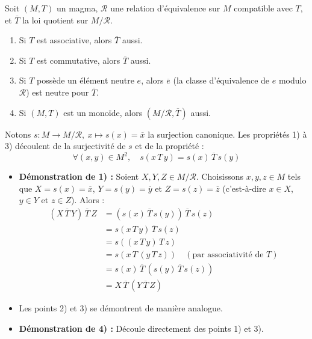 \documentclass[a4paper,11pt]{article}
\begin{document}
\begin{proposition}
Soit $(M, T)$ un magma, $\mathcal{R}$ une relation d'équivalence sur $M$ compatible avec $T$, et $\overline{T}$ la loi quotient sur $M / \mathcal{R}$.
\begin{enumerate}
    \item Si $T$ est associative, alors $\overline{T}$ aussi.
    \item Si $T$ est commutative, alors $\overline{T}$ aussi.
    \item Si $T$ possède un élément neutre $e$, alors $\overline{e}$ (la classe d'équivalence de $e$ modulo $\mathcal{R}$) est neutre pour $\overline{T}$.
    \item Si $(M, T)$ est un monoïde, alors $(M / \mathcal{R}, \overline{T})$ aussi.
\end{enumerate}
\end{proposition}

\begin{demonstration}
Notons $s : M \to M / \mathcal{R}, \ x \mapsto s(x) = \overline{x}$ la surjection canonique.
Les propriétés 1) à 3) découlent de la surjectivité de $s$ et de la propriété :
\[
\forall (x, y) \in M^2, \quad s(x \, T \, y) = s(x) \, \overline{T} \, s(y)
\]
\begin{itemize}
    \item \textbf{Démonstration de 1) :} Soient $X, Y, Z \in M / \mathcal{R}$. Choisissons $x, y, z \in M$ tels que $X = s(x) = \overline{x}$, $Y = s(y) = \overline{y}$ et $Z = s(z) = \overline{z}$ (c'est-à-dire $x \in X$, $y \in Y$ et $z \in Z$). Alors :
    \begin{align*}
        (X \, \overline{T} \, Y) \, \overline{T} \, Z &= (s(x) \, \overline{T} \, s(y)) \, \overline{T} \, s(z) \\
                                                       &= s(x \, T \, y) \, \overline{T} \, s(z) \\
                                                       &= s((x \, T \, y) \, T \, z) \\
                                                       &= s(x \, T \, (y \, T \, z)) \quad (\text{par associativité de } T) \\
                                                       &= s(x) \, \overline{T} \, (s(y) \, \overline{T} \, s(z)) \\
                                                       &= X \, \overline{T} \, (Y \, \overline{T} \, Z)
    \end{align*}
    \item Les points 2) et 3) se démontrent de manière analogue.
    \item \textbf{Démonstration de 4) :} Découle directement des points 1) et 3).
\end{itemize}
\end{demonstration}
\end{document}
